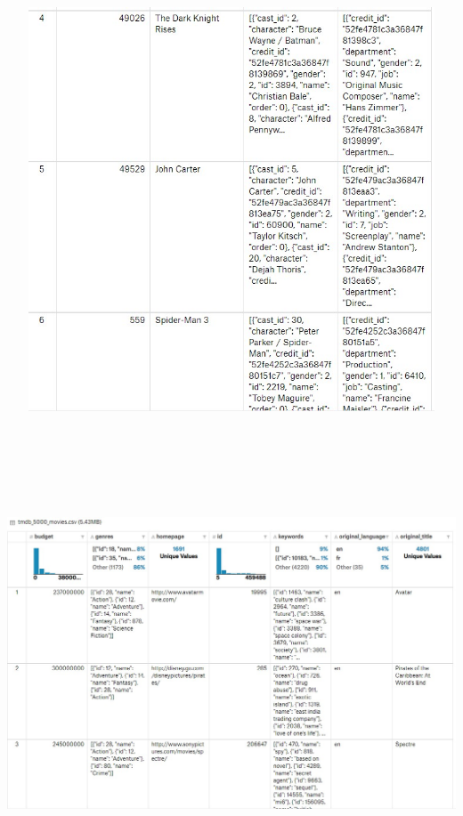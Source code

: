 \begin{center}
\includegraphics[width=14cm, height=12cm]{./Imagenes/img4.jpg}
\end{center}


\begin{center}
\includegraphics[width=18cm, height=14cm]{./Imagenes/img5.jpg}
\end{center}